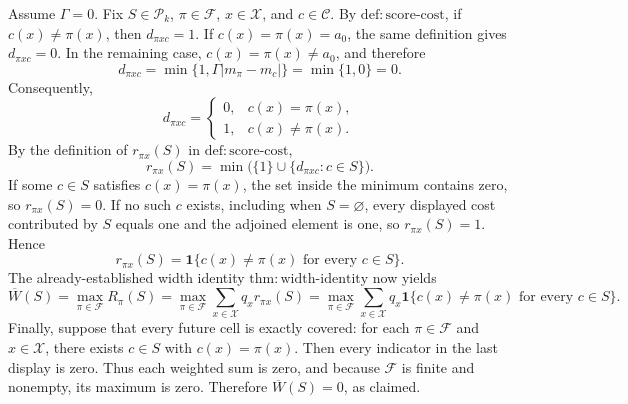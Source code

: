 Assume \(\Gamma=0\). Fix \(S\in\mathcal P_k\), \(\pi\in\mathcal F\), \(x\in\mathcal X\), and \(c\in\mathcal C\). By \(\mathrm{def{:}score\text{-}cost}\), if \(c(x)\neq\pi(x)\), then \(d_{\pi xc}=1\). If \(c(x)=\pi(x)=a_0\), the same definition gives \(d_{\pi xc}=0\). In the remaining case, \(c(x)=\pi(x)\neq a_0\), and therefore
\[
d_{\pi xc}=\min\{1,\Gamma|m_{\pi}-m_c|\}=\min\{1,0\}=0.
\]
Consequently,
\[
d_{\pi xc}=
\begin{cases}
0,&c(x)=\pi(x),\\
1,&c(x)\neq\pi(x).
\end{cases}
\]
By the definition of \(r_{\pi x}(S)\) in \(\mathrm{def{:}score\text{-}cost}\),
\[
r_{\pi x}(S)=\min\bigl(\{1\}\cup\{d_{\pi xc}:c\in S\}\bigr).
\]
If some \(c\in S\) satisfies \(c(x)=\pi(x)\), the set inside the minimum contains zero, so \(r_{\pi x}(S)=0\). If no such \(c\) exists, including when \(S=\varnothing\), every displayed cost contributed by \(S\) equals one and the adjoined element is one, so \(r_{\pi x}(S)=1\). Hence
\[
r_{\pi x}(S)=\mathbf 1\{c(x)\neq\pi(x)\text{ for every }c\in S\}.
\]
The already-established width identity \(\mathrm{thm{:}width\text{-}identity}\) now yields
\[
\overline W(S)
=\max_{\pi\in\mathcal F}R_{\pi}(S)
=\max_{\pi\in\mathcal F}\sum_{x\in\mathcal X}q_x r_{\pi x}(S)
=\max_{\pi\in\mathcal F}\sum_{x\in\mathcal X}q_x\mathbf 1\{c(x)\neq\pi(x)\text{ for every }c\in S\}.
\]
Finally, suppose that every future cell is exactly covered: for each \(\pi\in\mathcal F\) and \(x\in\mathcal X\), there exists \(c\in S\) with \(c(x)=\pi(x)\). Then every indicator in the last display is zero. Thus each weighted sum is zero, and because \(\mathcal F\) is finite and nonempty, its maximum is zero. Therefore \(\overline W(S)=0\), as claimed.
